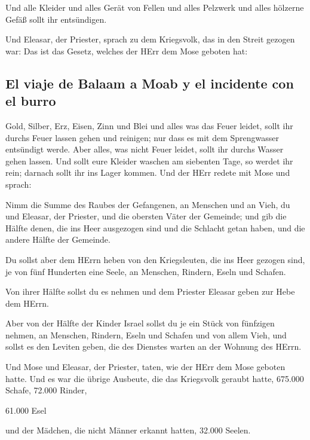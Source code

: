  Und alle Kleider und alles Gerät von Fellen und alles
Pelzwerk und alles hölzerne Gefäß sollt ihr entsündigen.

 Und Eleasar, der Priester, sprach zu dem Kriegsvolk, das
in den Streit gezogen war: Das ist das Gesetz, welches der HErr dem Mose
geboten hat:

\hypertarget{el-viaje-de-balaam-a-moab-y-el-incidente-con-el-burro}{%
\subsection{El viaje de Balaam a Moab y el incidente con el
burro}\label{el-viaje-de-balaam-a-moab-y-el-incidente-con-el-burro}}

 Gold, Silber, Erz, Eisen, Zinn und Blei 
und alles was das Feuer leidet, sollt ihr durchs Feuer lassen gehen und
reinigen; nur dass es mit dem Sprengwasser entsündigt werde. Aber alles,
was nicht Feuer leidet, sollt ihr durchs Wasser gehen lassen.
 Und sollt eure Kleider waschen am siebenten Tage, so
werdet ihr rein; darnach sollt ihr ins Lager kommen.  Und
der HErr redete mit Mose und sprach:

 Nimm die Summe des Raubes der Gefangenen, an Menschen
und an Vieh, du und Eleasar, der Priester, und die obersten Väter der
Gemeinde;  und gib die Hälfte denen, die ins Heer
ausgezogen sind und die Schlacht getan haben, und die andere Hälfte der
Gemeinde.

 Du sollst aber dem HErrn heben von den Kriegsleuten, die
ins Heer gezogen sind, je von fünf Hunderten eine Seele, an Menschen,
Rindern, Eseln und Schafen.

 Von ihrer Hälfte sollst du es nehmen und dem Priester
Eleasar geben zur Hebe dem HErrn.

 Aber von der Hälfte der Kinder Israel sollst du je ein
Stück von fünfzigen nehmen, an Menschen, Rindern, Eseln und Schafen und
von allem Vieh, und sollst es den Leviten geben, die des Dienstes warten
an der Wohnung des HErrn.

 Und Mose und Eleasar, der Priester, taten, wie der HErr
dem Mose geboten hatte.  Und es war die übrige Ausbeute,
die das Kriegsvolk geraubt hatte, 675.000 Schafe,  72.000
Rinder,

 61.000 Esel

 und der Mädchen, die nicht Männer erkannt hatten, 32.000
Seelen.


